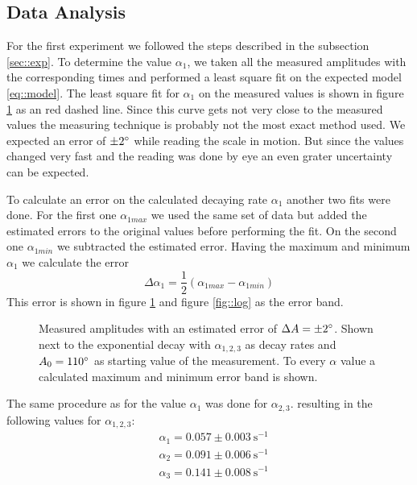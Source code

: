 \subsection{Data Analysis}
For the first experiment we followed the steps described in the subsection \ref{sec::exp}.
To determine the value $\alpha_{1}$, we taken all the measured amplitudes with the corresponding times and performed a least square fit on the expected model \ref{eq::model}.
The least square fit for $\alpha_1$ on the measured values is shown in figure \ref{fig::dampening} as an red dashed line.
Since this curve gets not very close to the measured values the measuring technique is probably not the most exact method used.
We expected an error of $\pm 2\degree$ while reading the scale in motion. 
But since the values changed very fast and the reading was done by eye an even grater uncertainty can be expected.

To calculate an error on the calculated decaying rate $\alpha_{1}$ another two fits were done.
For the first one $\alpha_{1max}$ we used the same set of data but added the estimated errors to the original values before performing the fit.
On the second one $\alpha_{1min}$ we subtracted the estimated error.
Having the maximum and minimum $\alpha_{1}$ we calculate the error 
\[
\Delta\alpha_1 = \frac{1}{2}(\alpha_{1max} - \alpha_{1min})
\]
This error is shown in figure \ref{fig::dampening} and figure \ref{fig::log} as the error band.

\begin{figure} [ht]
	
	\caption{Measured amplitudes with an estimated error of $\Delta A = \pm2 \degree$. Shown next to the exponential decay with $\alpha_{1, 2, 3}$ as decay rates and $A_0=110  \degree$  as starting value of the measurement. To every $\alpha$ value a calculated maximum and minimum error band is shown.}
	\label{fig::dampening}
\end{figure}

The same procedure as for the value $\alpha_1$ was done for $\alpha_{2,3}$.
resulting in the following values for $\alpha_{1, 2, 3}$:
\begin{align*}
&\alpha_1 = 0.057 \pm \SI{0.003}{\second^{-1}}\\
&\alpha_2 = 0.091 \pm \SI{0.006}{\second^{-1}}\\
&\alpha_3 = 0.141 \pm \SI{0.008}{\second^{-1}}
\end{align*}
